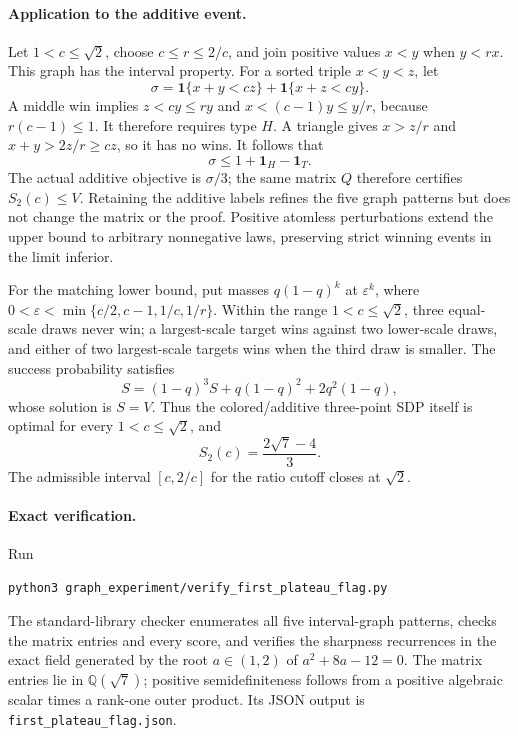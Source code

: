 \documentclass[11pt]{article}
\begin{document}
\paragraph{Application to the additive event.}
Let $1<c\le\sqrt2$, choose $c\le r\le2/c$, and join positive values
$x<y$ when $y<rx$. This graph has the interval property. For a sorted
triple $x<y<z$, let
\[
\sigma=\mathbf1\{x+y<cz\}+\mathbf1\{x+z<cy\}.
\]
A middle win implies $z<cy\le ry$ and
$x<(c-1)y\le y/r$, because $r(c-1)\le1$.
It therefore requires type $H$. A triangle gives $x>z/r$ and
$x+y>2z/r\ge cz$, so it has no wins. It follows that
\[
\sigma\le1+\mathbf1_H-\mathbf1_T.
\]
The actual additive objective is $\sigma/3$; the same matrix $Q$
therefore certifies $S_2(c)\le V$. Retaining the additive labels refines
the five graph patterns but does not change the matrix or the proof.
Positive atomless perturbations extend the upper bound to arbitrary
nonnegative laws, preserving strict winning events in the limit inferior.

For the matching lower bound, put masses $q(1-q)^k$ at $\varepsilon^k$,
where $0<\varepsilon<\min\{c/2,c-1,1/c,1/r\}$.
Within the range $1<c\le\sqrt2$, three equal-scale draws never win;
a largest-scale target wins against two lower-scale draws, and either
of two largest-scale targets wins when the third draw is smaller.
The success probability satisfies
\[
S=(1-q)^3S+q(1-q)^2+2q^2(1-q),
\]
whose solution is $S=V$. Thus the colored/additive three-point SDP itself
is optimal for every $1<c\le\sqrt2$, and
\[
S_2(c)=\frac{2\sqrt7-4}{3}.
\]
The admissible interval $[c,2/c]$ for the ratio cutoff closes at $\sqrt2$.

\paragraph{Exact verification.}
Run
\begin{verbatim}
python3 graph_experiment/verify_first_plateau_flag.py
\end{verbatim}
The standard-library checker enumerates all five interval-graph patterns,
checks the matrix entries and every score, and verifies the sharpness
recurrences in the exact field generated by the root $a\in(1,2)$ of
$a^2+8a-12=0$. The matrix entries lie in $\mathbb Q(\sqrt7)$; positive
semidefiniteness follows from a positive algebraic scalar times a rank-one
outer product. Its JSON output is \texttt{first\_plateau\_flag.json}.
\end{document}
